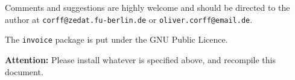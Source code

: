 \documentclass[11pt]{ltxdoc}
\begin{document}
\begin{sloppy}
		Comments and suggestions are highly welcome and
		should be directed to the author at
		\texttt{corff@zedat.fu-berlin.de} or
		\texttt{oliver.corff@email.de}.

		The \texttt{invoice} package is put under the GNU
		Public Licence.
	\else
		
		\vspace{1cm}

		\textbf{Attention:} Please install whatever is
		specified above, and recompile this document.
	\fi

	\end{sloppy}
\fi
\end{document}
